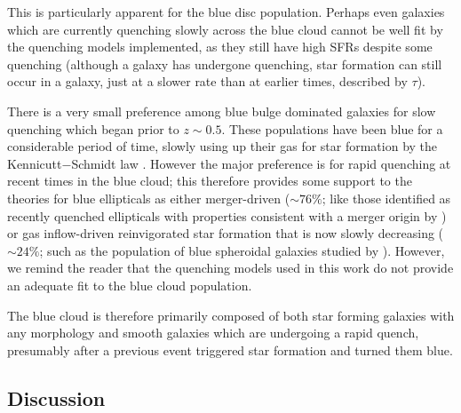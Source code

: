 This is particularly apparent for the blue disc population. Perhaps even galaxies which are currently quenching slowly across the blue cloud cannot be well fit by the quenching models implemented, as they still have high SFRs despite some quenching (although a galaxy has undergone quenching, star formation can still occur in a galaxy, just at a slower rate than at earlier times, described by $\tau$).


There is a very small preference among blue bulge dominated galaxies for slow quenching which began prior to $z \sim 0.5 $. These populations have been blue for a considerable period of time, slowly using up their gas for star formation by the Kennicutt$-$Schmidt law \citep{Schmidt59, Kennicutt97}. However the major preference is for rapid quenching at recent times in the blue cloud; this therefore provides some support to the theories for blue ellipticals as either merger-driven ($\sim76\%$; like those identified as recently quenched ellipticals with properties consistent with a merger origin by \citealt{McIntosh14}) or gas inflow-driven reinvigorated star formation that is now slowly decreasing ($\sim24\%$; such as the population of blue spheroidal galaxies studied by \citealt{Kaviraj13}). However, we remind the reader that the quenching models used in this work do not provide an adequate fit to the blue cloud population.

The blue cloud is therefore primarily composed of both star forming galaxies with any morphology and smooth galaxies which are undergoing a rapid quench, presumably after a previous event triggered star formation and turned them blue.


\subsection{Discussion}\label{morph:discussion}

